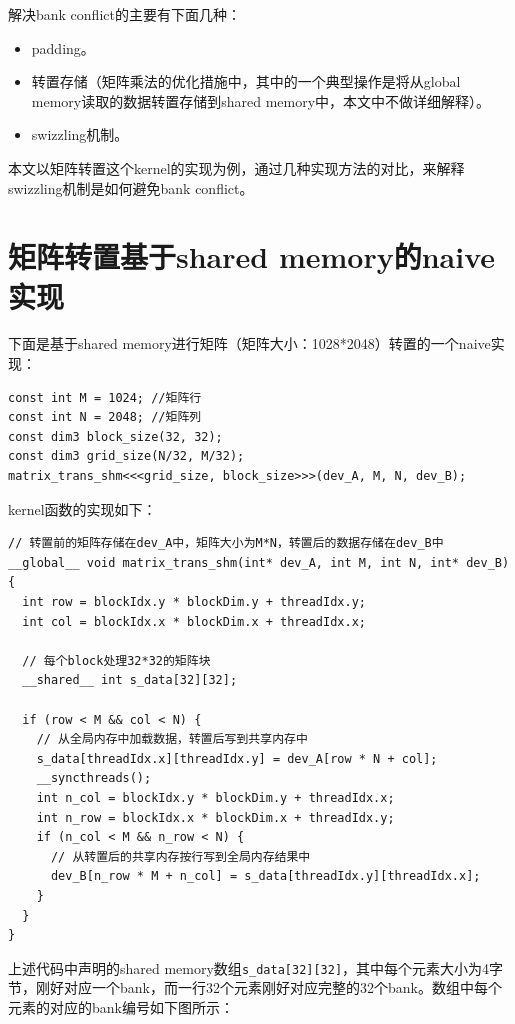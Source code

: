 解决bank conflict的主要有下面几种：

\begin{itemize}
  \item padding。
  \item 转置存储（矩阵乘法的优化措施中，其中的一个典型操作是将从global memory读取的数据转置存储到shared memory中，本文中不做详细解释）。
  \item swizzling机制。
\end{itemize}

本文以矩阵转置这个kernel的实现为例，通过几种实现方法的对比，来解释swizzling机制是如何避免bank conflict。

\section{矩阵转置基于shared memory的naive实现}

下面是基于shared memory进行矩阵（矩阵大小：1028*2048）转置的一个naive实现：

\begin{lstlisting}
const int M = 1024; //矩阵行
const int N = 2048; //矩阵列
const dim3 block_size(32, 32);
const dim3 grid_size(N/32, M/32);
matrix_trans_shm<<<grid_size, block_size>>>(dev_A, M, N, dev_B);
\end{lstlisting}

kernel函数的实现如下：

\begin{lstlisting}
// 转置前的矩阵存储在dev_A中，矩阵大小为M*N，转置后的数据存储在dev_B中
__global__ void matrix_trans_shm(int* dev_A, int M, int N, int* dev_B) {
  int row = blockIdx.y * blockDim.y + threadIdx.y;
  int col = blockIdx.x * blockDim.x + threadIdx.x;

  // 每个block处理32*32的矩阵块
  __shared__ int s_data[32][32];

  if (row < M && col < N) {
    // 从全局内存中加载数据，转置后写到共享内存中
    s_data[threadIdx.x][threadIdx.y] = dev_A[row * N + col];
    __syncthreads();
    int n_col = blockIdx.y * blockDim.y + threadIdx.x;
    int n_row = blockIdx.x * blockDim.x + threadIdx.y;
    if (n_col < M && n_row < N) {
      // 从转置后的共享内存按行写到全局内存结果中
      dev_B[n_row * M + n_col] = s_data[threadIdx.y][threadIdx.x];
    }
  }
}
\end{lstlisting}

上述代码中声明的shared memory数组\lstinline|s_data[32][32]|，其中每个元素大小为4字节，刚好对应一个bank，而一行32个元素刚好对应完整的32个bank。数组中每个元素的对应的bank编号如下图所示：

